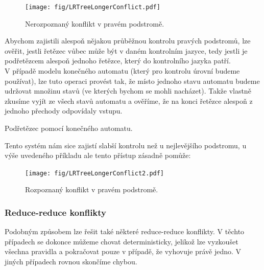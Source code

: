 \begin{figure}[H]
  \centering
  \texttt{[image: fig/LRTreeLongerConflict.pdf]}
  \caption{Nerozpoznaný konflikt v pravém podstromě.}
\end{figure}

Abychom zajistili alespoň nějakou průběžnou kontrolu pravých podstromů,
lze ověřit, jestli řetězec vůbec může být v daném kontrolním
jazyce, tedy jestli je podřetězcem alespoň jednoho řetězce, který do kontrolního
jazyka patří.\\

V případě modelu konečného automatu (který pro kontrolu úrovní budeme používat),
lze tuto operaci provést tak, že místo jednoho stavu automatu budeme udržovat
množinu stavů (ve kterých bychom se mohli nacházet). Takže vlastně zkusíme
vyjít ze všech stavů automatu a ověříme, že na konci řetězce alespoň z jednoho
přechody odpovídaly vstupu.\\

\begin{algorithm}[H]
  \caption{Podřetězec pomocí konečného automatu.}
  \label{alg:lr}

  \BlankLine
\end{algorithm}
\vspace{0.5cm}

Tento systém nám sice zajistí slabší kontrolu než u nejlevějšího podstromu,
u výše uvedeného příkladu ale tento přístup zásadně pomůže:

\begin{figure}[H]
  \centering
  \texttt{[image: fig/LRTreeLongerConflict2.pdf]}
  \caption{Rozpoznaný konflikt v pravém podstromě.}
\end{figure}

\subsubsection*{Reduce-reduce konflikty}

Podobným způsobem lze řešit také některé reduce-reduce konflikty.
V těchto případech se dokonce můžeme chovat deterministicky,
jelikož lze vyzkoušet všechna pravidla a pokračovat pouze v případě,
že vyhovuje právě jedno. V jiných případech rovnou skončíme chybou.


